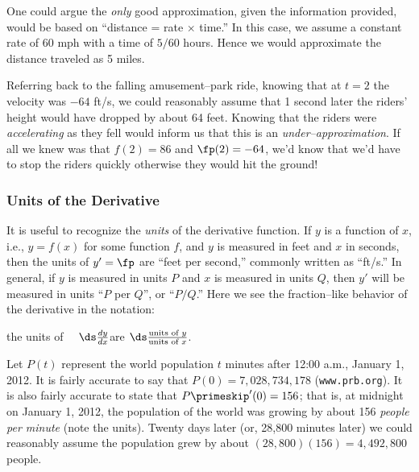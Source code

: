 One could argue the \textit{only} good approximation, given the information provided, would be based on ``distance = rate $\times$ time.'' In this case, we assume a constant rate of 60 mph with a time of $5/60$ hours. Hence we would approximate the distance traveled as 5 miles.\bigskip


Referring back to the falling amusement--park ride, knowing that at $t=2$ the velocity was $-64$ ft/s, we could reasonably assume that 1 second later the riders' height would have dropped by about 64 feet. Knowing that the riders were \textit{accelerating} as they fell would inform us that this is an \textit{under--approximation}. If all we knew was that $f(2) = 86$ and $\fp(2) = -64$, we'd know that we'd have to stop the riders quickly otherwise they would hit the ground!

\subsubsection{Units of the Derivative}

It is useful to recognize the \textit{units} of the derivative function. If $y$ is a function of $x$, i.e., $y=f(x)$ for some function $f$, and $y$ is measured in feet and $x$ in seconds, then the units of $y' = \fp$ are ``feet per second,'' commonly written as ``ft/s.'' In general, if $y$ is measured in units $P$ and $x$ is measured in units $Q$, then $y'$ will be measured in units ``$P$ per $Q$'', or ``$P/Q$.'' Here we see the fraction--like behavior of the derivative in the notation:
	\begin{center}
	the units of $\quad\ds \frac{dy}{dx}$\quad are \quad$\ds \frac{\text{units of $y$}}{\text{units of $x$}}$.
	\end{center}

{Let $P(t)$ represent the world population $t$ minutes after 12:00 a.m., January 1, 2012. It is fairly accurate to say that $P(0) = 7,028,734,178$ (\texttt{www.prb.org}). It is also fairly accurate to state that $P\primeskip'(0) = 156$; that is, at midnight on January 1, 2012, the population of the world was growing by about 156 \textit{people per minute} (note the units). Twenty days later (or, 28,800 minutes later) we could reasonably assume the population grew by about $(28,800)(156) = 4,492,800$ people.}

